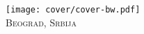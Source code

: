 \newpage
\thispagestyle{empty}
\begin{center}
\texttt{[image: cover/cover-bw.pdf]}\\[1pc]
{\scshape Beograd, Srbija \\ \year}
\end{center}
